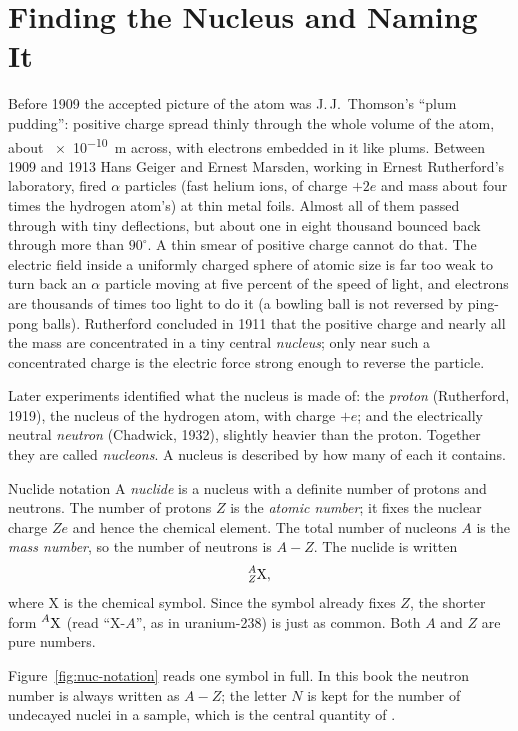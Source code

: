 \section{Finding the Nucleus and Naming It}\label{sec:nuc-naming}

Before 1909 the accepted picture of the atom was J.\,J.~Thomson's ``plum pudding'': positive charge
spread thinly through the whole volume of the atom, about \SI{e-10}{m} across, with electrons embedded
in it like plums. Between 1909 and 1913 Hans Geiger and Ernest Marsden, working in Ernest Rutherford's
laboratory, fired $\alpha$ particles (fast helium ions, of charge $+2e$ and mass about four times the
hydrogen atom's) at thin metal foils. Almost all of them passed through with tiny deflections, but
about one in eight thousand bounced back through more than $90^\circ$. A thin smear of positive charge
cannot do that. The electric field inside a uniformly charged sphere of atomic size is far too weak to
turn back an $\alpha$ particle moving at five percent of the speed of light, and electrons are thousands
of times too light to do it (a bowling ball is not reversed by ping-pong balls). Rutherford concluded
in 1911 that the positive charge and nearly all the mass are concentrated in a tiny central
\emph{nucleus}; only near such a concentrated charge is the electric force strong enough to reverse
the particle.

Later experiments identified what the nucleus is made of: the \emph{proton} (Rutherford, 1919), the
nucleus of the hydrogen atom, with charge $+e$; and the electrically neutral \emph{neutron}
(Chadwick, 1932), slightly heavier than the proton. Together they are called \emph{nucleons}. A
nucleus is described by how many of each it contains.

\begin{defbox}{Nuclide notation}
A \emph{nuclide} is a nucleus with a definite number of protons and neutrons. The number of protons
$Z$ is the \emph{atomic number}; it fixes the nuclear charge $Ze$ and hence the chemical element. The
total number of nucleons $A$ is the \emph{mass number}, so the number of neutrons is $A-Z$. The nuclide
is written
\[
\prescript{A}{Z}{\mathrm{X}},
\]
where X is the chemical symbol. Since the symbol already fixes $Z$, the shorter form $\prescript{A}{}{\mathrm{X}}$ (read
``X-$A$'', as in uranium-238) is just as common. Both $A$ and $Z$ are pure numbers.
\end{defbox}

Figure~\ref{fig:nuc-notation} reads one symbol in full. In this book the neutron number is always
written as $A-Z$; the letter $N$ is kept for the number of undecayed nuclei in a sample, which is the
central quantity of .

